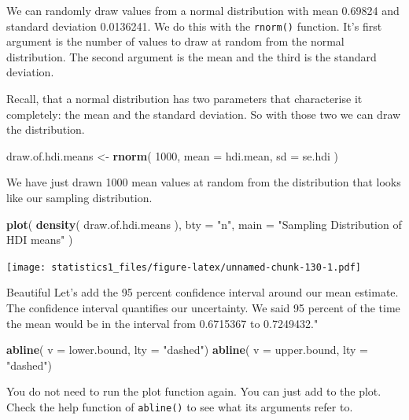\documentclass[]{book}
\newenvironment{Shaded}{\begin{snugshade}}{\end{snugshade}}
\newcommand{\KeywordTok}[1]{\textcolor[rgb]{0.13,0.29,0.53}{\textbf{#1}}}
\newcommand{\DataTypeTok}[1]{\textcolor[rgb]{0.13,0.29,0.53}{#1}}
\newcommand{\DecValTok}[1]{\textcolor[rgb]{0.00,0.00,0.81}{#1}}
\newcommand{\StringTok}[1]{\textcolor[rgb]{0.31,0.60,0.02}{#1}}
\newcommand{\NormalTok}[1]{#1}
\theoremstyle{definition}
\theoremstyle{definition}
\theoremstyle{definition}
\theoremstyle{remark}
\begin{document}
We can randomly draw values from a normal distribution with mean 0.69824
and standard deviation 0.0136241. We do this with the \texttt{rnorm()}
function. It's first argument is the number of values to draw at random
from the normal distribution. The second argument is the mean and the
third is the standard deviation.

Recall, that a normal distribution has two parameters that characterise
it completely: the mean and the standard deviation. So with those two we
can draw the distribution.

\begin{Shaded}
\begin{Highlighting}[]
\NormalTok{draw.of.hdi.means <-}\StringTok{ }\KeywordTok{rnorm}\NormalTok{( }\DecValTok{1000}\NormalTok{, }\DataTypeTok{mean =}\NormalTok{ hdi.mean, }\DataTypeTok{sd =}\NormalTok{ se.hdi )}
\end{Highlighting}
\end{Shaded}

We have just drawn 1000 mean values at random from the distribution that
looks like our sampling distribution.

\begin{Shaded}
\begin{Highlighting}[]
\KeywordTok{plot}\NormalTok{(}
 \KeywordTok{density}\NormalTok{( draw.of.hdi.means ),}
 \DataTypeTok{bty =} \StringTok{"n"}\NormalTok{,}
 \DataTypeTok{main =} \StringTok{"Sampling Distribution of HDI means"}
\NormalTok{)}
\end{Highlighting}
\end{Shaded}

\texttt{[image: statistics1\_files/figure-latex/unnamed-chunk-130-1.pdf]}

Beautiful Let's add the 95 percent confidence interval around our mean
estimate. The confidence interval quantifies our uncertainty. We said 95
percent of the time the mean would be in the interval from 0.6715367 to
0.7249432."

\begin{Shaded}
\begin{Highlighting}[]
\KeywordTok{abline}\NormalTok{( }\DataTypeTok{v =}\NormalTok{ lower.bound, }\DataTypeTok{lty =} \StringTok{"dashed"}\NormalTok{)}
\KeywordTok{abline}\NormalTok{( }\DataTypeTok{v =}\NormalTok{ upper.bound,  }\DataTypeTok{lty =} \StringTok{"dashed"}\NormalTok{)}
\end{Highlighting}
\end{Shaded}

You do not need to run the plot function again. You can just add to the
plot. Check the help function of \texttt{abline()} to see what its
arguments refer to.
\end{document}

